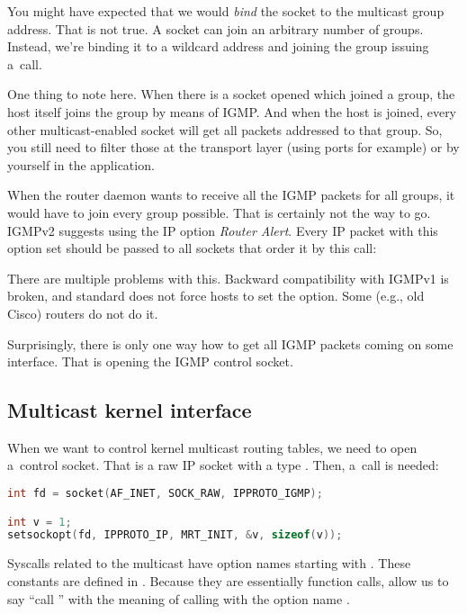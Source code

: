

\noindent You might have expected that we would \emph{bind} the socket to the
multicast group address. That is not true. A socket can join an arbitrary
number of groups. Instead, we're binding it to a wildcard address and joining
the group issuing a~\setsockopt call.

One thing to note here. When there is a socket opened which joined a group, the host itself joins the group by means of IGMP. And when the host is
joined, every other multicast-enabled socket will get all packets addressed to that
group. So, you still need to filter those at the transport layer (using ports
for example) or by yourself in the application.

When the router daemon wants to receive all the IGMP packets for all groups, it
would have to join every group possible. That is certainly not the way to go.
IGMPv2 suggests using the IP option \emph{Router Alert}. Every IP packet with this option
set should be passed to all sockets that order it by this \setsockopt call:



\noindent There are multiple problems with this. Backward compatibility with
IGMPv1 is broken, and standard does not force hosts to set the option. Some (e.g.,
old Cisco) routers do not do it.

Surprisingly, there is only one way how to get all IGMP packets coming on
some interface. That is opening the IGMP control socket.

\subsection{Multicast kernel interface}
\label{mcast-kernel}

When we want to control kernel multicast routing tables, we need to open
a~control socket. That is a raw IP socket with a type .
Then, a~\setsockopt call is needed:

\begin{lstlisting}[language=c]
int fd = socket(AF_INET, SOCK_RAW, IPPROTO_IGMP);

int v = 1;
setsockopt(fd, IPPROTO_IP, MRT_INIT, &v, sizeof(v));
\end{lstlisting}

\noindent Syscalls  related to the multicast have option names starting
with . These constants are defined in .
Because they are essentially function calls, allow us to say ``call
'' with the meaning of calling \setsockopt with the option
name .

